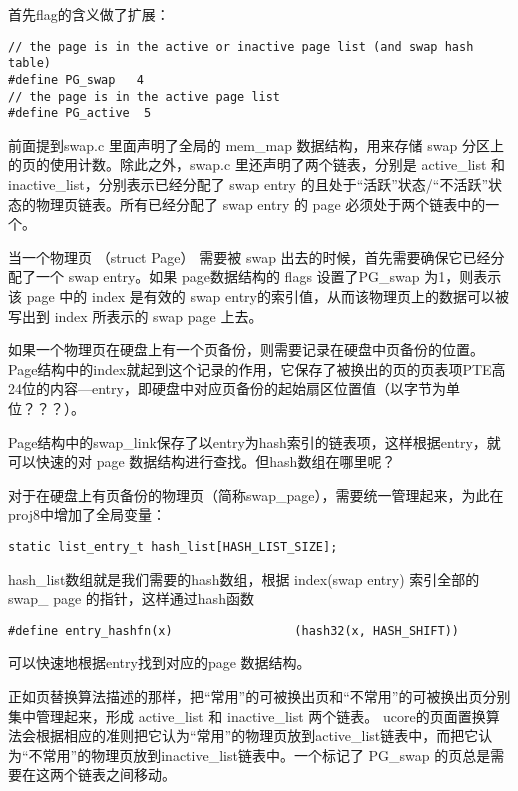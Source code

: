 首先flag的含义做了扩展：

\begin{lstlisting}
// the page is in the active or inactive page list (and swap hash table)
#define PG_swap   4 
// the page is in the active page list
#define PG_active  5
\end{lstlisting}

前面提到swap.c 里面声明了全局的 mem\_map 数据结构，用来存储 swap
分区上的页的使用计数。除此之外，swap.c 里还声明了两个链表，分别是
active\_list 和 inactive\_list，分别表示已经分配了 swap entry
的且处于``活跃''状态/``不活跃''状态的物理页链表。所有已经分配了 swap
entry 的 page 必须处于两个链表中的一个。

当一个物理页 （struct Page） 需要被 swap
出去的时候，首先需要确保它已经分配了一个 swap entry。如果 page数据结构的
flags 设置了PG\_swap 为1，则表示该 page 中的 index 是有效的 swap
entry的索引值，从而该物理页上的数据可以被写出到 index 所表示的 swap page
上去。

如果一个物理页在硬盘上有一个页备份，则需要记录在硬盘中页备份的位置。Page结构中的index就起到这个记录的作用，它保存了被换出的页的页表项PTE高24位的内容---entry，即硬盘中对应页备份的起始扇区位置值（以字节为单位？？？）。

Page结构中的swap\_link保存了以entry为hash索引的链表项，这样根据entry，就可以快速的对
page 数据结构进行查找。但hash数组在哪里呢？

对于在硬盘上有页备份的物理页（简称swap\_page），需要统一管理起来，为此在proj8中增加了全局变量：

\begin{lstlisting}
static list_entry_t hash_list[HASH_LIST_SIZE];
\end{lstlisting}

hash\_list数组就是我们需要的hash数组，根据 index(swap entry) 索引全部的
swap\_ page 的指针，这样通过hash函数

\begin{lstlisting}
#define entry_hashfn(x)                 (hash32(x, HASH_SHIFT))
\end{lstlisting}

可以快速地根据entry找到对应的page 数据结构。

正如页替换算法描述的那样，把``常用''的可被换出页和``不常用''的可被换出页分别集中管理起来，形成
active\_list 和 inactive\_list 两个链表。
ucore的页面置换算法会根据相应的准则把它认为``常用''的物理页放到active\_list链表中，而把它认为``不常用''的物理页放到inactive\_list链表中。一个标记了
PG\_swap 的页总是需要在这两个链表之间移动。

